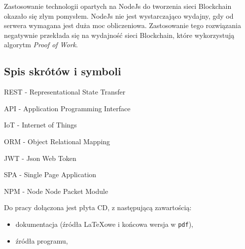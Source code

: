 \documentclass[a4paper,12pt]{book}
\begin{document}
Zastosowanie technologii opartych na NodeJs do tworzenia sieci Blockchain okazało się złym pomysłem. NodeJs nie jest wystarczająco wydajny, gdy od serwera wymagana jest duża moc obliczeniowa. Zastosowanie tego rozwiązania negatywnie przekłada się na wydajność sieci Blockchain, które wykorzystują algorytm \textit{Proof of Work}.

 


\begin{appendices}
 
  \chapter*{Spis skrótów i symboli}
  
  \begin{description}
    \item REST - Representational State Transfer
    \item API - Application Programming Interface
    \item IoT - Internet of Things
    \item ORM - Object Relational Mapping
    \item JWT - Json Web Token
    \item SPA - Single Page Application
    \item NPM - Node Node Packet Module
  \end{description}

Do pracy dołączona jest płyta CD, z następującą zawartością:

\begin{itemize}
  \item dokumentacja (źródła \LaTeX owe i końcowa wersja w \texttt{pdf}),
  \item źródła programu,
\end{itemize}

\listoffigures

\end{appendices}
\end{document}
